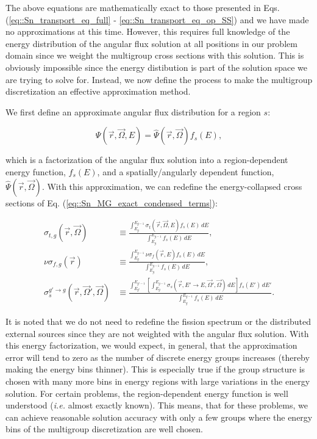 The above equations are mathematically exact to those presented in Eqs. (\ref{eq::Sn_transport_eq_full} - \ref{eq::Sn_transport_eq_op_SS}) and we have made no approximations at this time. However, this requires full knowledge of the energy distribution of the angular flux solution at all positions in our problem domain since we weight the multigroup cross sections with this solution. This is obviously impossible since the energy distibution is part of the solution space we are trying to solve for. Instead, we now define the process to make the multigroup discretization an effective approximation method.

We first define an approximate angular flux distribution for a region $s$:

\begin{equation}
\label{eq::Sn_MG_flux_approx}
\Psi (\vec{r},\vec{\Omega}, E) =  \hat{\Psi} (\vec{r},\vec{\Omega}) f_{s} (E) ,
\end{equation}

\noindent which is a factorization of the angular flux solution into a region-dependent energy function, $f_s (E)$, and a spatially/angularly dependent function, $\hat{\Psi} (\vec{r},\vec{\Omega})$. With this approximation, we can redefine the energy-collapsed cross sections of Eq. (\ref{eq::Sn_MG_exact_condensed_terms}):

\begin{equation}
\label{eq::MG_approx_condensed_terms}
\begin{aligned}
\sigma_{t,g} (\vec{r},\vec{\Omega}) & \equiv \frac{\int_{E_{g}}^{E_{g-1}} \sigma_{t} (\vec{r},\vec{\Omega},E) f_{s} (E) \, dE}{\int_{E_{g}}^{E_{g-1}} f_{s} (E) \, dE} ,\\
\nu\sigma_{f,g} (\vec{r}) & \equiv \frac{\int_{E_{g}}^{E_{g-1}} \nu\sigma_{f} (\vec{r},E)  f_{s} (E) \, dE }{\int_{E_{g}}^{E_{g-1}} f_{s} (E) \, dE}, \\
\sigma_{s}^{g' \rightarrow g} (\vec{r},\vec{\Omega}' , \vec{\Omega} ) & \equiv \frac{\int_{E_{g'}}^{E_{g'-1}} \left[ \int_{E_{g}}^{E_{g-1}} \sigma_s (\vec{r},E' \rightarrow E,\vec{\Omega}' , \vec{\Omega} ) \, dE \right] f_{s} (E')\, dE' }{\int_{E_{g}}^{E_{g-1}}  f_{s} (E) \, dE} .
\end{aligned}
\end{equation}

\noindent It is noted that we do not need to redefine the fission spectrum or the distributed external sources since they are not weighted with the angular flux solution. With this energy factorization, we would expect, in general, that the approximation error will tend to zero as the number of discrete energy groups increases (thereby making the energy bins thinner). This is especially true if the group structure is chosen with many more bins in energy regions with large variations in the energy solution. For certain problems, the region-dependent energy function is well understood ({\em i.e.} almost exactly known). This means, that for these problems, we can achieve reasonable solution accuracy with only a few groups where the energy bins of the multigroup discretization are well chosen.

